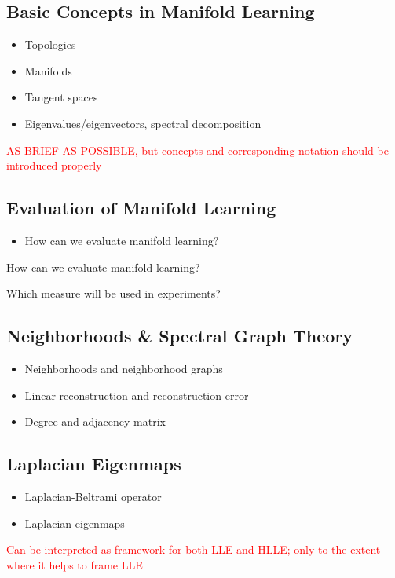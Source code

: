 \subsection{Basic Concepts in Manifold Learning}
\label{basic-conc}

\begin{itemize}
  \item Topologies
  \item Manifolds
  \item Tangent spaces
  \item Eigenvalues/eigenvectors, spectral decomposition
\end{itemize}

\textcolor{red}{AS BRIEF AS POSSIBLE, but concepts and corresponding notation
should be introduced properly}

\subsection{Evaluation of Manifold Learning}
\label{eval-mani}

\begin{itemize}
  \item How can we evaluate manifold learning?
\end{itemize}

How can we evaluate manifold learning?

Which measure will be used in experiments?

\subsection{Neighborhoods \& Spectral Graph Theory}
\label{neigh-graph}

\begin{itemize}
  \item Neighborhoods and neighborhood graphs
  \item Linear reconstruction and reconstruction error
  \item Degree and adjacency matrix
\end{itemize}

\subsection{Laplacian Eigenmaps}
\label{laplace}

\begin{itemize}
  \item Laplacian-Beltrami operator
  \item Laplacian eigenmaps
\end{itemize}

\textcolor{red}{Can be interpreted as framework for both LLE and HLLE; only to
the extent where it helps to frame LLE}

